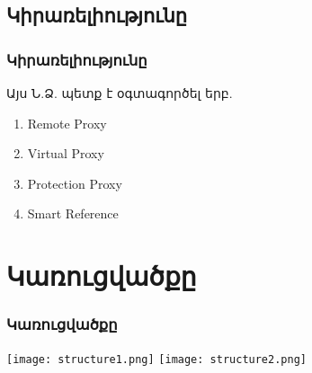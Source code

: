 \documentclass{beamer}
\begin{document}
\subsection{Կիրառելիությունը}
\begin{frame}\frametitle{Կիրառելիությունը}
Այս Ն.Ձ. պետք է օգտագործել երբ.
\vfill
\begin{enumerate}
    \item Remote Proxy \pause \vfill
    \item Virtual Proxy \pause \vfill
    \item Protection Proxy \pause \vfill
    \item Smart Reference
\end{enumerate}
\end{frame}

\section{Կառուցվածքը}
\begin{frame}\frametitle{Կառուցվածքը}
\begin{center}
    \texttt{[image: structure1.png]}
    \texttt{[image: structure2.png]}
\end{center}
\end{frame}
\end{document}
